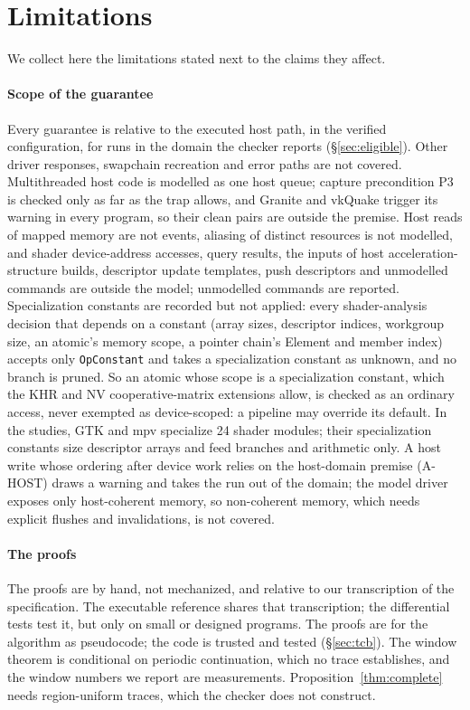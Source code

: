 \documentclass[acmtog,anonymous,review]{acmart}
\newcommand{\code}[1]{\texttt{#1}}
\begin{document}
\section{Limitations}
\label{sec:limits}
We collect here the limitations stated next to the claims they affect.

\paragraph{Scope of the guarantee}
Every guarantee is relative to the executed host path, in the verified configuration, for runs in the domain the
checker reports (\S\ref{sec:eligible}). Other driver responses, swapchain recreation and error paths are not covered.
Multithreaded host code is modelled as one host queue; capture precondition P3 is checked only as far as the trap
allows, and Granite and vkQuake trigger its warning in every program, so their clean pairs are outside the premise.
Host reads of mapped memory are not events, aliasing of distinct resources is not modelled, and shader device-address
accesses, query results, the inputs of host acceleration-structure builds, descriptor update templates, push
descriptors and unmodelled commands are outside the model; unmodelled commands are reported. Specialization constants are recorded but not applied: every shader-analysis decision that depends on a
constant (array sizes, descriptor indices, workgroup size, an atomic's memory scope, a pointer chain's Element and
member index) accepts only \code{OpConstant} and takes a specialization constant as unknown, and no branch is pruned.
So an atomic whose scope is a specialization constant, which the KHR and NV cooperative-matrix extensions allow, is
checked as an ordinary access, never exempted as device-scoped: a pipeline may override its default. In the studies,
GTK and mpv specialize 24 shader modules; their specialization constants size descriptor arrays and feed branches and
arithmetic only. A host write whose
ordering after device work relies on the host-domain premise (A-HOST) draws a warning and takes the run out of the
domain; the model driver exposes only host-coherent memory, so non-coherent memory, which needs explicit flushes and
invalidations, is not covered.

\paragraph{The proofs}
The proofs are by hand, not mechanized, and relative to our transcription of the specification. The executable
reference shares that transcription; the differential tests test it, but only on small or designed programs. The
proofs are for the algorithm as pseudocode; the code is trusted and tested (\S\ref{sec:tcb}). The window theorem is
conditional on periodic continuation, which no trace establishes, and the window numbers we report are measurements.
Proposition~\ref{thm:complete} needs region-uniform traces, which the checker does not construct.
\end{document}
